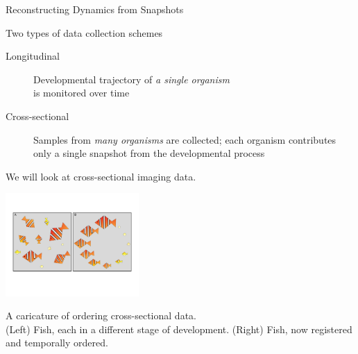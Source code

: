 \documentclass[12pt]{beamer}
\begin{document}
\begin{frame}{Reconstructing Dynamics from Snapshots}

Two types of data collection schemes%

\begin{description}
\item[Longitudinal] Developmental trajectory of {\em a single organism} \\is monitored over time
\item[Cross-sectional] Samples from {\em many organisms} are collected; each organism contributes only a single snapshot from the developmental process
\end{description}

\begin{center}
We will look at cross-sectional imaging data. %

\includegraphics[width=2in]{fig1}

{\scriptsize A caricature of ordering cross-sectional data. \\
(Left) Fish, each in a different stage of development.  (Right) Fish, now registered and temporally ordered. \par}
\end{center}

\end{frame}
\end{document}

